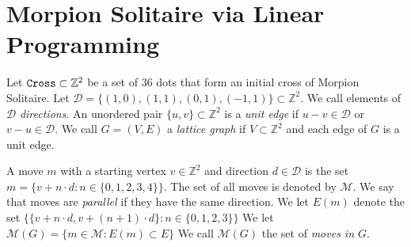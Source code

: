 
\newcommand{\D}{\mathcal{D}}

\section{Morpion Solitaire via Linear Programming}
\label{sec:linear}

Let $\texttt{Cross} \subset \mathbb{Z}^2$ be a set of $36$ dots that form an initial cross of Morpion Solitaire.
Let $\D = \{ (1, 0), (1,1), (0,1), (-1,1) \} \subset \mathbb{Z}^2$. We call elements of $\D$ \emph{directions}.
An unordered pair $\{ u, v \} \subset \mathbb{Z}^2$ is a \emph{unit edge} if $u - v \in \D$ or $v - u \in \D$.
We call $G = (V, E)$  a \emph{lattice graph} if $V \subset \mathbb{Z}^2$
      and each edge of $G$ is a unit edge.




A move $m$ with a starting vertex $v \in \mathbb{Z}^2$ and direction $d \in \D$ is the set
$
   m = \{ v + n \cdot d \colon n \in \{ 0, 1, 2, 3, 4 \} \}.
$
The set of all moves is denoted by $\mathcal{M}$.
We say that moves are \emph{parallel} if they have the same direction.
We let $E(m)$ denote the set $\{ \{ v + n \cdot d, v + (n+1) \cdot d \} \colon n \in \{0, 1, 2, 3 \} \}$
    We let
    $
      \mathcal{M}(G) = \{ m \in \mathcal{M} \colon E(m) \subset E \}
    $
     We call $\mathcal{M}(G)$ the set of \emph{moves in $G$}.


